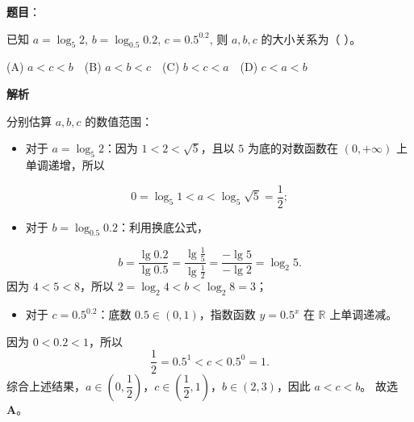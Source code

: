 \begin{answer}

\textbf{题目}：

已知 $a = \log_5 2$, $b = \log_{0.5} 0.2$, $c = 0.5^{0.2}$, 则 $a, b, c$ 的大小关系为（ ）。

(A) $a < c < b$　(B) $a < b < c$　(C) $b < c < a$　(D) $c < a < b$

\textbf{解析}

分别估算 $a, b, c$ 的数值范围：
\begin{itemize}
\item 对于 $a = \log_5 2$：因为 $1 < 2 < \sqrt{5}$，且以 $5$ 为底的对数函数在 $(0, +\infty)$ 上单调递增，所以
\end{itemize}
\nopagebreak[4]
\[0 = \log_5 1 < a < \log_5 \sqrt{5} = \frac{1}{2};\]
\begin{itemize}
\item 对于 $b = \log_{0.5} 0.2$：利用换底公式，
\end{itemize}
\nopagebreak[4]
\[b = \frac{\lg 0.2}{\lg 0.5} = \frac{\lg\frac{1}{5}}{\lg\frac{1}{2}} = \frac{-\lg 5}{-\lg 2} = \log_2 5.\]
  因为 $4 < 5 < 8$，所以 $2 = \log_2 4 < b < \log_2 8 = 3$；
\begin{itemize}
\item 对于 $c = 0.5^{0.2}$：底数 $0.5 \in (0, 1)$，指数函数 $y = 0.5^x$ 在 $\mathbb{R}$ 上单调递减。
\end{itemize}
  因为 $0 < 0.2 < 1$，所以
\nopagebreak[4]
\[\frac{1}{2} = 0.5^1 < c < 0.5^0 = 1.\]
综合上述结果，$a \in \left(0, \dfrac{1}{2}\right)$，$c \in \left(\dfrac{1}{2}, 1\right)$，$b \in (2, 3)$，因此 $a < c < b$。
故选 \textbf{A}。


\end{answer}
